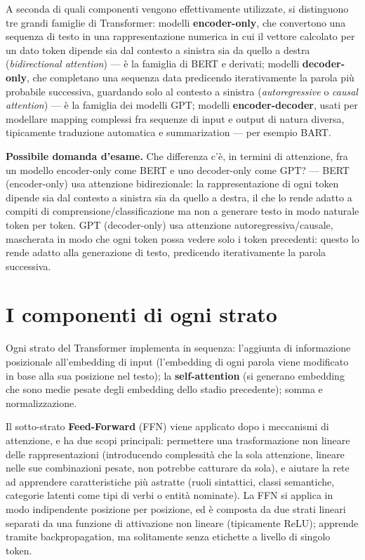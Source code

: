 \documentclass[11pt,a4paper]{report}
\newcommand{\domandaesame}[1]{\begin{esame}\textbf{Possibile domanda d'esame.} #1\end{esame}}
\begin{document}
A seconda di quali componenti vengono effettivamente utilizzate, si distinguono tre grandi famiglie di Transformer: modelli \textbf{encoder-only}, che convertono una sequenza di testo in una rappresentazione numerica in cui il vettore calcolato per un dato token dipende sia dal contesto a sinistra sia da quello a destra (\emph{bidirectional attention}) --- è la famiglia di BERT e derivati; modelli \textbf{decoder-only}, che completano una sequenza data predicendo iterativamente la parola più probabile successiva, guardando solo al contesto a sinistra (\emph{autoregressive} o \emph{causal attention}) --- è la famiglia dei modelli GPT; modelli \textbf{encoder-decoder}, usati per modellare mapping complessi fra sequenze di input e output di natura diversa, tipicamente traduzione automatica e summarization --- per esempio BART.

\domandaesame{Che differenza c'è, in termini di attenzione, fra un modello encoder-only come BERT e uno decoder-only come GPT? --- BERT (encoder-only) usa attenzione bidirezionale: la rappresentazione di ogni token dipende sia dal contesto a sinistra sia da quello a destra, il che lo rende adatto a compiti di comprensione/classificazione ma non a generare testo in modo naturale token per token. GPT (decoder-only) usa attenzione autoregressiva/causale, mascherata in modo che ogni token possa vedere solo i token precedenti: questo lo rende adatto alla generazione di testo, predicendo iterativamente la parola successiva.}

\section{I componenti di ogni strato}

Ogni strato del Transformer implementa in sequenza: l'aggiunta di informazione posizionale all'embedding di input (l'embedding di ogni parola viene modificato in base alla sua posizione nel testo); la \textbf{self-attention} (si generano embedding che sono medie pesate degli embedding dello stadio precedente); somma e normalizzazione.

Il sotto-strato \textbf{Feed-Forward} (FFN) viene applicato dopo i meccanismi di attenzione, e ha due scopi principali: permettere una trasformazione non lineare delle rappresentazioni (introducendo complessità che la sola attenzione, lineare nelle sue combinazioni pesate, non potrebbe catturare da sola), e aiutare la rete ad apprendere caratteristiche più astratte (ruoli sintattici, classi semantiche, categorie latenti come tipi di verbi o entità nominate). La FFN si applica in modo indipendente posizione per posizione, ed è composta da due strati lineari separati da una funzione di attivazione non lineare (tipicamente ReLU); apprende tramite backpropagation, ma solitamente senza etichette a livello di singolo token.
\end{document}
